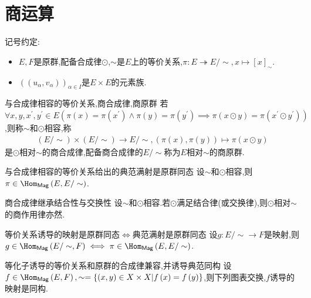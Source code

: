 \section{商运算}

记号约定:
\begin{itemize}
	\item $E,F$是原群,配备合成律$\odot$,$\sim$是$E$上的等价关系,$\pi:E\twoheadrightarrow E/\sim,x\mapsto\left[x\right]_{\sim}$.
	\item $\left(\left(u_{\alpha},v_{\alpha}\right)\right)_{\alpha\in I}$是$E\times E$的元素族.
\end{itemize}


\begin{definition}{与合成律相容的等价关系,商合成律,商原群}{}
	若$\forall x,y,x^{\prime},y^{\prime}\in E\left(\pi\left(x\right)=\pi\left(x^{\prime}\right)\wedge\pi\left(y\right)=\pi\left(y^{\prime}\right)\implies\pi\left(x\odot y\right)=\pi\left(x^{\prime}\odot y^{\prime}\right)\right)$,则称$\sim$和$\odot$相容,称
	\begin{align*}
		\left(E/\sim\right)\times\left(E/\sim\right)\to E/\sim,\left(\pi\left(x\right),\pi\left(y\right)\right)\mapsto\pi\left(x\odot y\right)
	\end{align*}
	是$\odot$相对$\sim$的商合成律,配备商合成律的$E/\sim$称为$E$相对$\sim$的商原群.
\end{definition}

\begin{proposition}{与合成律相容的等价关系给出的典范满射是原群同态}{}
	设$\sim$和$\odot$相容,则$\pi\in\Hom_{\mathsf{Mag}}\left(E,E/\sim\right)$.
\end{proposition}

\begin{proposition}{商合成律继承结合性与交换性}{}
	设$\sim$和$\odot$相容.若$\odot$满足结合律(或交换律),则$\odot$相对$\sim$的商作用律亦然.
\end{proposition}

\begin{proposition}{等价关系诱导的映射是原群同态$\iff$典范满射是原群同态}{}
	设$g:E/\sim\to F$是映射,则$g\in\Hom_{\mathsf{Mag}}\left(E/\sim,F\right)\iff\pi\in\Hom_{\mathsf{Mag}}\left(E,E/\sim\right)$.
\end{proposition}

\begin{proposition}{等化子诱导的等价关系和原群的合成律兼容,并诱导典范同构}{}
	设$f\in\Hom_{\mathsf{Mag}}\left(E,F\right),\sim=\left\{\left(x,y\right)\in X\times X\middle|f\left(x\right)=f\left(y\right)\right\}$,则下列图表交换,$f$诱导的映射是同构.
	\begin{center}
	\end{center}
\end{proposition}

